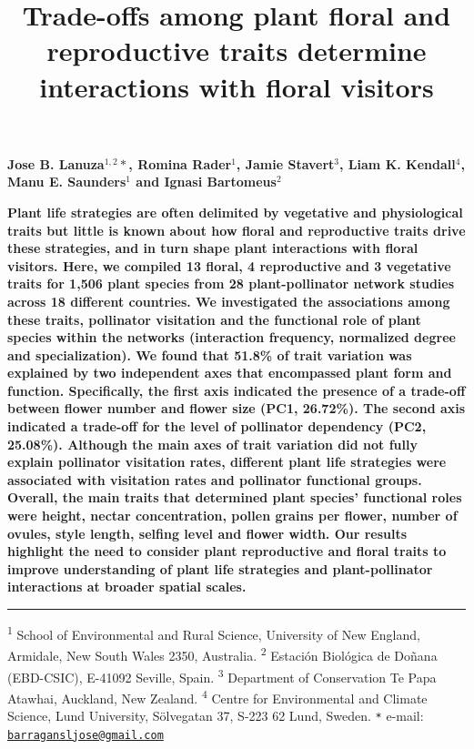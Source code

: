 \documentclass[
  12pt,
  a4paper,
]{article}
\title{\singlespacing \vspace{-1.5cm} \LARGE Trade-offs among plant floral and reproductive traits determine interactions with floral visitors}
\author{}
\date{\vspace{-2.5em}}
\begin{document}
\maketitle

\vspace{-2.2cm}
\singlespacing
\large

\textbf{Jose B. Lanuza$^{1,2}*$, Romina Rader$^{1}$, Jamie Stavert$^{3}$, Liam K. Kendall$^{4}$, Manu E. Saunders$^{1}$ and Ignasi Bartomeus$^{2}$}

\normalsize

\textbf{Plant life strategies are often delimited by vegetative and physiological traits but little is known about how floral and reproductive traits drive these strategies, and in turn shape plant interactions with floral visitors. Here, we compiled 13 floral, 4 reproductive and 3 vegetative traits for 1,506 plant species from 28 plant-pollinator network studies across 18 different countries. We investigated the associations among these traits, pollinator visitation and the functional role of plant species within the networks (interaction frequency, normalized degree and specialization). We found that 51.8\% of trait variation was explained by two independent axes that encompassed plant form and function. Specifically, the first axis indicated the presence of a trade-off between flower number and flower size (PC1, 26.72\%). The second axis indicated a trade-off for the level of pollinator dependency (PC2, 25.08\%). Although the main axes of trait variation did not fully explain pollinator visitation rates, different plant life strategies were associated with visitation rates and pollinator functional groups. Overall, the main traits that determined plant species' functional roles were height, nectar concentration, pollen grains per flower, number of ovules, style length, selfing level and flower width. Our results highlight the need to consider plant reproductive and floral traits to improve understanding of plant life strategies and plant-pollinator interactions at broader spatial scales.}

\small
\vspace{-0.5cm}

\noindent

\rule{\textwidth}{1pt}

\textsuperscript{1} School of Environmental and Rural Science, University of New England, Armidale, New South Wales 2350, Australia. \textsuperscript{2} Estación Biológica de Doñana (EBD-CSIC), E-41092 Seville, Spain. \textsuperscript{3} Department of Conservation \textbar{} Te Papa Atawhai, Auckland, New Zealand. \textsuperscript{4} Centre for Environmental and Climate Science, Lund University, Sölvegatan 37, S-223 62 Lund, Sweden. \texttt{*} e-mail: \href{mailto:barragansljose@gmail.com}{\nolinkurl{barragansljose@gmail.com}}
\end{document}
